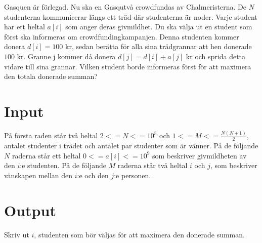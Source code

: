 
Gasquen är förlegad. Nu ska en Gasqutvå crowdfundas av Chalmeristerna. De $N$ studenterna kommunicerar längs ett träd där studenterna är noder. Varje student har ett heltal $a[i]$ som anger deras givmildhet. Du ska välja ut en student som först ska informeras om crowdfundingkampanjen. Denna studenten kommer donera $d[i]=100$ kr, sedan berätta för alla sina trädgrannar att hen donerade $100$ kr. Granne j kommer då donera $d[j]=d[i]+a[j]$ kr och sprida detta vidare till sina grannar. Vilken student borde informeras först för att maximera den totala donerade summan?

\section*{Input}

På första raden står två heltal $2<=N<=10^5$ och $1<=M<=\frac{N(N+1)}{2}$, antalet studenter i trädet och antalet par studenter som är vänner. På de följande $N$ raderna står ett heltal $0<=a[i]<=10^9$ som beskriver givmildheten av den $i$:e studenten. På de följande $M$ raderna står två heltal $i$ och $j$, som beskriver vänskapen mellan den $i$:e och den $j$:e personen. 

\section*{Output}

Skriv ut $i$, studenten som bör väljas för att maximera den donerade summan. 
